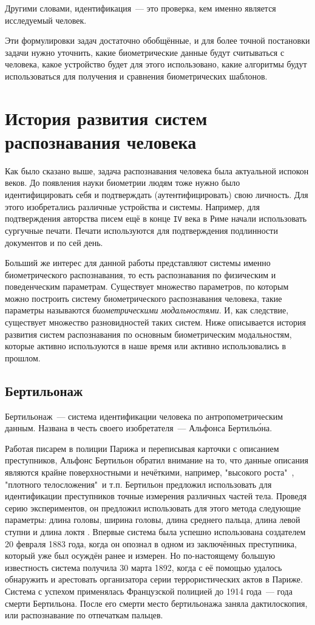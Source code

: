 \documentclass[14pt, a4paper]{extarticle}
\begin{document}
Другими словами, идентификация~--- это проверка, кем именно является исследуемый человек.

Эти формулировки задач достаточно обобщённые, и для более точной постановки задачи нужно уточнить, какие биометрические данные будут считываться с человека, какое устройство будет для этого использовано, какие алгоритмы будут использоваться для получения и сравнения биометрических шаблонов. 

\newpage
\section{История развития систем распознавания человека}
Как было сказано выше, задача распознавания человека была актуальной испокон веков. До появления науки биометрии людям тоже нужно было идентифицировать себя и подтверждать (аутентифицировать) свою личность. Для этого изобретались различные устройства и системы.
Например, для подтверждения авторства писем ещё в конце \texttt{IV} века в Риме начали использовать сургучные печати. Печати используются для подтверждения подлинности документов и по сей день.

Больший же интерес для данной работы представляют системы именно биометрического распознавания, то есть распознавания по физическим и поведенческим параметрам. Существует множество параметров, по которым можно построить систему биометрического распознавания человека, такие параметры называются \textit{биометрическими модальностями}. И, как следствие, существует множество разновидностей таких систем. Ниже описывается история развития систем распознавания по основным биометрическим модальностям, которые активно используются в наше время или активно использовались в прошлом.

\subsection{Бертильонаж}
Бертильонаж~--- система идентификации человека по антропометрическим данным. Названа в честь своего изобретателя~--- Альфонса Бертиль\'{о}на.

Работая писарем в полиции Парижа и переписывая карточки с описанием преступников, Альфонс Бертильон обратил внимание на то, что данные описания являются крайне поверхностными и нечёткими, например, "высокого роста"\ , "плотного телосложения"\  и т.п. Бертильон предложил использовать для идентификации преступников точные измерения различных частей тела. Проведя серию экспериментов, он предложил использовать для этого метода следующие параметры: длина головы, ширина головы, длина среднего пальца, длина левой ступни и длина локтя \cite{bertillon}. Впервые система была успешно использована создателем 20 февраля 1883 года, когда он опознал в одном из заключённых преступника, который уже был осуждён ранее и измерен. Но по-настоящему большую известность система получила 30 марта 1892, когда с её помощью удалось обнаружить и арестовать организатора серии террористических актов в Париже.
Система с успехом применялась Французской полицией до 1914 года~--- года смерти Бертильона. После его смерти место бертильонажа заняла дактилоскопия, или распознавание по отпечаткам пальцев.
\end{document}
